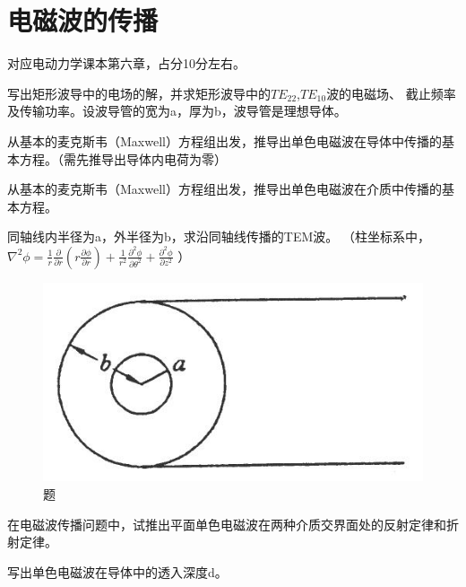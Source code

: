 \section{电磁波的传播}
对应电动力学课本第六章，占分10分左右。

\begin{question}
    写出矩形波导中的电场的解，并求矩形波导中的$TE_{22}$,$TE_{10}$波的电磁场、
    截止频率及传输功率。设波导管的宽为a，厚为b，波导管是理想导体。
\end{question}

\begin{question}
    从基本的麦克斯韦（Maxwell）方程组出发，推导出单色电磁波在导体中传播的基本方程。（需先推导出导体内电荷为零）
\end{question}

\begin{question}
    从基本的麦克斯韦（Maxwell）方程组出发，推导出单色电磁波在介质中传播的基本方程。
\end{question}

\begin{question}
    同轴线内半径为a，外半径为b，求沿同轴线传播的TEM波。
    （柱坐标系中，$\nabla^2\phi=\frac{1}{r}\frac{\partial }{\partial r}(r\frac{\partial \phi}{\partial r})+\frac{1}{r^2 }\frac{\partial^2 \phi}{\partial \theta^2}+\frac{\partial^2\phi}{\partial z^2}$ ）
    \begin{figure}[ht]
        \centering
        \includegraphics[height=3 cm]{images/q5_1.jpg}
        \caption{题\thequestion}
    \end{figure}
\end{question}

\begin{question}
    在电磁波传播问题中，试推出平面单色电磁波在两种介质交界面处的反射定律和折射定律。
\end{question}

\begin{question}
    写出单色电磁波在导体中的透入深度d。    
\end{question}
